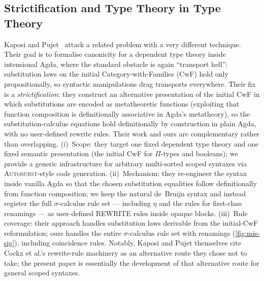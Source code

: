\documentclass[a4paper,UKenglish,cleveref, autoref, thm-restate,anonymous]{lipics-v2021}
\begin{document}
\subsection*{Strictification and Type Theory in Type Theory}
Kaposi and Pujet~\cite{10.1145/3747535} attack a related problem with a very
different technique. Their goal is to formalise canonicity for a dependent
type theory inside intensional Agda, where the standard obstacle is again
``transport hell'': substitution laws on the initial Category-with-Families
(CwF) hold only propositionally, so syntactic manipulations drag transports
everywhere. Their fix is a \emph{strictification}: they construct an
alternative presentation of the initial CwF in which substitutions are
encoded as metatheoretic functions (exploiting that function composition is
definitionally associative in Agda's metatheory), so the substitution-calculus
equations hold definitionally by construction in plain Agda, with no
user-defined rewrite rules. Their work and ours are complementary rather than
overlapping. (i)~Scope: they target one fixed dependent type theory and one
fixed semantic presentation (the initial CwF for $Π$-types and booleans);
we provide a generic infrastructure for arbitrary multi-sorted scoped
syntaxes via \textsc{Autosubst}-style code generation. (ii)~Mechanism: they
re-engineer the syntax inside vanilla Agda so that the chosen
substitution equalities follow definitionally from function composition;
we keep the natural de~Bruijn syntax and instead register the full
$σ$-calculus rule set --- including $η$ and the rules for first-class
renamings --- as user-defined REWRITE rules inside opaque blocks. (iii)~Rule
coverage: their approach handles substitution laws derivable from the
initial-CwF reformulation; ours handles the entire $σ$-calculus rule set with
renamings (\cref{fig:mis-sig}), including coincidence rules.
Notably, Kaposi and Pujet themselves cite Cockx et al.'s rewrite-rule machinery as an
alternative route they chose not to take; the present paper is essentially
the development of that alternative route for general scoped syntaxes.
\end{document}
